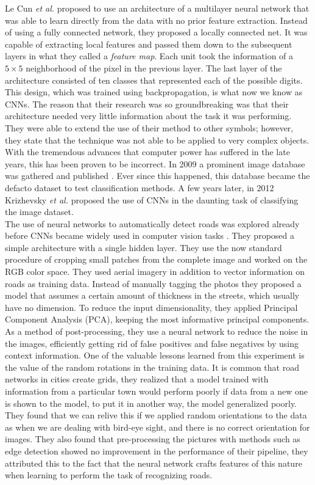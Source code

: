 Le Cun \textit{et al.} \cite{119325} proposed to use an architecture of a multilayer neural network that was able to learn directly from the data with no prior feature extraction. Instead of using a fully connected network, they proposed a locally connected net. It was capable of extracting local features and passed them down to the subsequent layers in what they called a \textit{feature map}. Each unit took the information of a $5\times 5$ neighborhood of the pixel in the previous layer. The last layer of the architecture consisted of ten classes that represented each of the possible digits. This design, which was trained using backpropagation, is what now we know as CNNs. The reason that their research was so groundbreaking was that their architecture needed very little information about the task it was performing. They were able to extend the use of their method to other symbols; however, they state that the technique was not able to be applied to very complex objects. With the tremendous advances that computer power has suffered in the late years, this has been proven to be incorrect. In 2009 a prominent image database was gathered and published \cite{Deng09imagenet:a}. Ever since this happened, this database became the defacto dataset to test classification methods. A few years later, in 2012 Krizhevsky \textit{et al.} \cite{krizhevsky} proposed the use of CNNs in the daunting task of classifying the image dataset.\\

The use of neural networks to automatically detect roads was explored already before CNNs became widely used in computer vision tasks \cite{Mnih:2010:LDR:1888212.1888230}. They proposed a simple architecture with a single hidden layer. They use the now standard procedure of cropping small patches from the complete image and worked on the RGB color space. They used aerial imagery in addition to vector information on roads as training data. Instead of manually tagging the photos they proposed a model that assumes a certain amount of thickness in the streets, which usually have no dimension. To reduce the input dimensionality, they applied Principal Component Analysis (PCA), keeping the most informative principal components. As a method of post-processing, they use a neural network to reduce the noise in the images, efficiently getting rid of false positives and false negatives by using context information. One of the valuable lessons learned from this experiment is the value of the random rotations in the training data. It is common that road networks in cities create grids, they realized that a model trained with information from a particular town would perform poorly if data from a new one is shown to the model, to put it in another way, the model generalized poorly. They found that we can relive this if we applied random orientations to the data as when we are dealing with bird-eye sight, and there is no correct orientation for images. They also found that pre-processing the pictures with methods such as edge detection showed no improvement in the performance of their pipeline, they attributed this to the fact that the neural network crafts features of this nature when learning to perform the task of recognizing roads.\\

